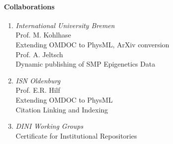 \paragraph{Collaborations}
\begin{enumerate}
    \item {\sl International University  Bremen} \\
            Prof. M. Kohlhase \\
            Extending OMDOC to PhysML, ArXiv conversion     \\
            Prof. A. Jeltsch \\
            Dynamic publishing of SMP Epigenetics Data

    \item {\sl ISN Oldenburg} \\
            Prof. E.R. Hilf \\
            Extending OMDOC to PhysML\\
            Citation Linking and Indexing

    \item {\sl DINI Working Groups} \\
            Certificate for Institutional Repositories

\end{enumerate}

\nocite{HilKohSta:copmem06,DINI06}
